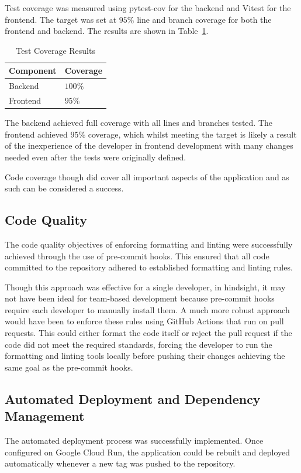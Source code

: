 Test coverage was measured using pytest-cov for the backend and Vitest for the frontend. The target was set at $95\%$ line and branch coverage for both the frontend and backend. The results are shown in Table~\ref{tab:test-coverage-results}.
\begin{table} [H]
    \centering
    \begin{tabular}{|m{3cm}|m{3cm}|}
        \hline
        \textbf{Component} & \textbf{Coverage} \\
        \hline
        Backend & $100\%$ \\
        \hline
        Frontend & $95\%$ \\
        \hline
    \end{tabular}
    \caption{Test Coverage Results}
    \label{tab:test-coverage-results}
\end{table}

The backend achieved full coverage with all lines and branches tested. The frontend achieved $95\%$ coverage, which whilst meeting the target is likely a result of the inexperience of the developer in frontend development with many changes needed even after the tests were originally defined.

Code coverage though did cover all important aspects of the application and as such can be considered a success.
\ifshowappendix
\fi

\subsection{Code Quality}
The code quality objectives of enforcing formatting and linting were successfully achieved through the use of pre-commit hooks. This ensured that all code committed to the repository adhered to established formatting and linting rules.

Though this approach was effective for a single developer, in hindsight, it may not have been ideal for team-based development because pre-commit hooks require each developer to manually install them. A much more robust approach would have been to enforce these rules using GitHub Actions that run on pull requests. This could either format the code itself or reject the pull request if the code did not meet the required standards, forcing the developer to run the formatting and linting tools locally before pushing their changes achieving the same goal as the pre-commit hooks.

\subsection{Automated Deployment and Dependency Management}
The automated deployment process was successfully implemented. Once configured on Google Cloud Run, the application could be rebuilt and deployed automatically whenever a new tag was pushed to the repository.

